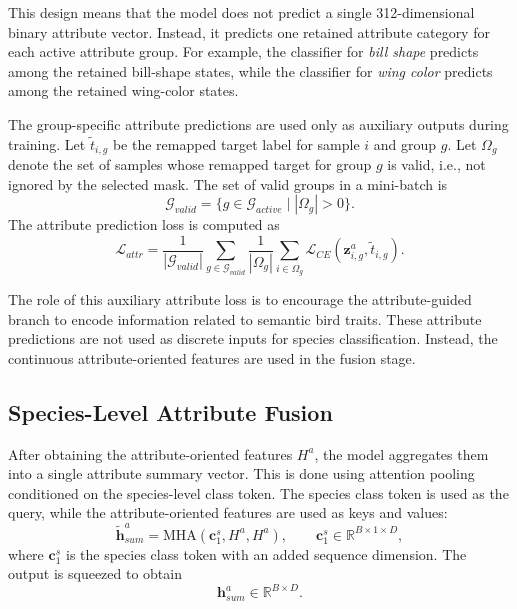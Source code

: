 This design means that the model does not predict a single 312-dimensional binary attribute vector. Instead, it predicts one retained attribute category for each active attribute group. For example, the classifier for \textit{bill shape} predicts among the retained bill-shape states, while the classifier for \textit{wing color} predicts among the retained wing-color states.

The group-specific attribute predictions are used only as auxiliary outputs during training. Let \(\tilde{t}_{i,g}\) be the remapped target label for sample \(i\) and group \(g\). Let \(\Omega_g\) denote the set of samples whose remapped target for group \(g\) is valid, i.e., not ignored by the selected mask. The set of valid groups in a mini-batch is
\begin{equation}
    \mathcal{G}_{valid}
    =
    \{g \in \mathcal{G}_{active} \mid |\Omega_g| > 0\}.
\end{equation}
The attribute prediction loss is computed as
\begin{equation}
    \mathcal{L}_{attr}
    =
    \frac{1}{|\mathcal{G}_{valid}|}
    \sum_{g \in \mathcal{G}_{valid}}
    \frac{1}{|\Omega_g|}
    \sum_{i \in \Omega_g}
    \mathcal{L}_{CE}
    \left(
        \mathbf{z}^{a}_{i,g},
        \tilde{t}_{i,g}
    \right).
\end{equation}

The role of this auxiliary attribute loss is to encourage the attribute-guided branch to encode information related to semantic bird traits. These attribute predictions are not used as discrete inputs for species classification. Instead, the continuous attribute-oriented features are used in the fusion stage.

\subsection{Species-Level Attribute Fusion}

After obtaining the attribute-oriented features \(H^{a}\), the model aggregates them into a single attribute summary vector. This is done using attention pooling conditioned on the species-level class token. The species class token is used as the query, while the attribute-oriented features are used as keys and values:
\begin{equation}
 \tilde{\mathbf{h}}^{a}_{sum}
=
\mathrm{MHA}
\left(
    \mathbf{c}^{s}_{1},
    H^{a},
    H^{a}
\right),
\qquad
\mathbf{c}^{s}_{1} \in \mathbb{R}^{B \times 1 \times D},
\end{equation}
where \(\mathbf{c}^{s}_{1}\) is the species class token with an added sequence dimension. The output is squeezed to obtain
\begin{equation}
    \mathbf{h}^{a}_{sum}
    \in
    \mathbb{R}^{B \times D}.
\end{equation}

